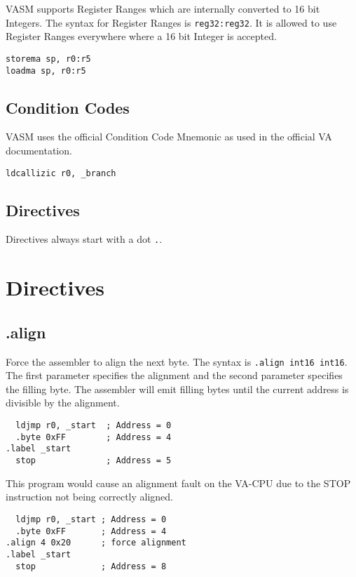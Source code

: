 VASM supports Register Ranges which are internally converted to 16 bit Integers. The syntax for Register Ranges is \verb|reg32:reg32|. It is allowed
to use Register Ranges everywhere where a 16 bit Integer is accepted. 

\begin{verbatim}
storema sp, r0:r5
loadma sp, r0:r5
\end{verbatim}

\subsection{Condition Codes}

VASM uses the official Condition Code Mnemonic as used in the official VA documentation. 

\begin{verbatim}
ldcallizic r0, _branch
\end{verbatim}

\subsection{Directives}

Directives always start with a dot \verb|.|. 

\section{Directives}

\subsection{.align}

Force the assembler to align the next byte. The syntax is \verb|.align int16 int16|. The first parameter specifies the alignment and the second parameter
specifies the filling byte. The assembler will emit filling bytes until the current address is divisible by the alignment. 

\begin{verbatim}
  ldjmp r0, _start  ; Address = 0
  .byte 0xFF        ; Address = 4
.label _start       
  stop              ; Address = 5
\end{verbatim}

This program would cause an alignment fault on the VA-CPU due to the STOP instruction not being correctly aligned. 

\begin{verbatim}
  ldjmp r0, _start ; Address = 0
  .byte 0xFF       ; Address = 4
.align 4 0x20      ; force alignment
.label _start
  stop             ; Address = 8
\end{verbatim}

